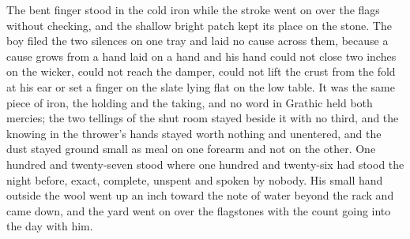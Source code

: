 The bent finger stood in the cold iron while the stroke went on over the flags without checking, and the shallow bright patch kept its place on the stone. The boy filed the two silences on one tray and laid no cause across them, because a cause grows from a hand laid on a hand and his hand could not close two inches on the wicker, could not reach the damper, could not lift the crust from the fold at his ear or set a finger on the slate lying flat on the low table. It was the same piece of iron, the holding and the taking, and no word in Grathic held both mercies; the two tellings of the shut room stayed beside it with no third, and the knowing in the thrower's hands stayed worth nothing and unentered, and the dust stayed ground small as meal on one forearm and not on the other. One hundred and twenty-seven stood where one hundred and twenty-six had stood the night before, exact, complete, unspent and spoken by nobody. His small hand outside the wool went up an inch toward the note of water beyond the rack and came down, and the yard went on over the flagstones with the count going into the day with him.
